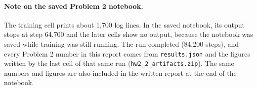 \documentclass[11pt,a4paper]{article}
\begin{document}
\paragraph{Note on the saved Problem 2 notebook.}
The training cell prints about 1,700 log lines. In the saved notebook,
its output stops at step 64,700 and the later cells show no output,
because the notebook was saved while training was still running. The
run completed (84,200 steps), and every Problem 2 number in this report
comes from \texttt{results.json} and the figures written by the last
cell of that same run (\texttt{hw2\_2\_artifacts.zip}). The same
numbers and figures are also included in the written report at the end
of the notebook.
\end{document}
